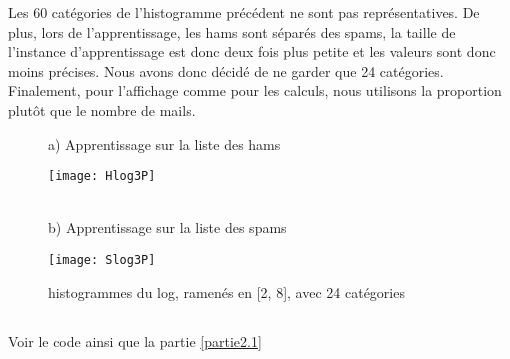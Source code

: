 \documentclass[a4paper]{article}
\begin{document}
\begin{minipage}{\textwidth}
Les 60 catégories de l'histogramme précédent ne sont pas représentatives. De plus, lors de l'apprentissage, les hams sont séparés des spams, la taille de l'instance d'apprentissage est donc deux fois plus petite et les valeurs sont donc moins précises. Nous avons donc décidé de ne garder que 24 catégories. Finalement, pour l'affichage comme pour les calculs, nous utilisons la proportion plutôt que le nombre de mails.
\begin{figure}[H]
\centering
{\footnotesize a) Apprentissage sur la liste des hams\par}
\texttt{[image: Hlog3P]}
{\footnotesize \\b) Apprentissage sur la liste des spams\par}
\texttt{[image: Slog3P]}
\caption{histogrammes du log, ramenés en [2, 8], avec 24 catégories}
\end{figure}
\end{minipage}

\subsection{}
Voir le code ainsi que la partie  \ref{partie2.1}
\end{document}
